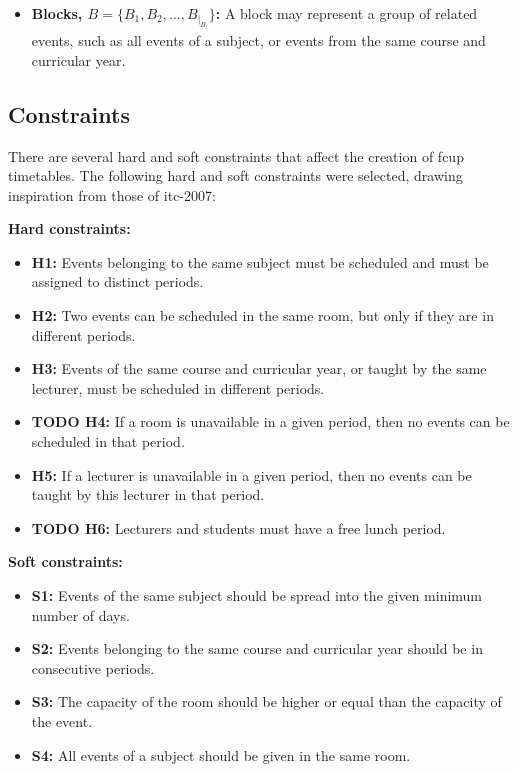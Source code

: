 \begin{itemize}
	\item \textbf{Blocks, \(B = \{B_1, B_2, ..., B_|_B_|\}\):} A block may represent a group of related events, such as all events of a subject, or events from the same course and curricular year.
\end{itemize}

\subsection{Constraints}

There are several hard and soft constraints that affect the creation of \ac{fcup} timetables. The following hard and soft constraints were selected, drawing inspiration from those of \ac{itc-2007}:

\textbf{Hard constraints:}

\begin{itemize}
	\item \textbf{H1:} Events belonging to the same subject must be scheduled and must be assigned to distinct periods.
	\item \textbf{H2:} Two events can be scheduled in the same room, but only if they are in different periods.
	\item \textbf{H3:} Events of the same course and curricular year, or taught by the same lecturer, must be scheduled in different periods.
	\item \textbf{TODO H4:} If a room is unavailable in a given period, then no events can be scheduled in that period.
	\item \textbf{H5:} If a lecturer is unavailable in a given period, then no events can be taught by this lecturer in that period.
	\item \textbf{TODO H6:} Lecturers and students must have a free lunch period.
\end{itemize}

\textbf{Soft constraints:}

\begin{itemize}
	\item \textbf{S1:} Events of the same subject should be spread into the given minimum number of days.
	\item \textbf{S2:} Events belonging to the same course and curricular year should be in consecutive periods.
	\item \textbf{S3:} The capacity of the room should be higher or equal than the capacity of the event.
	\item \textbf{S4:} All events of a subject should be given in the same room.
\end{itemize}


